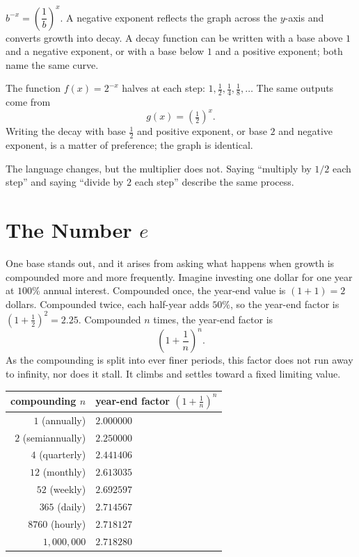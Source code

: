 \documentclass[12pt]{book}
\begin{document}
\begin{keyidea}
$b^{-x}=\left(\dfrac1b\right)^{x}$. A negative exponent reflects the graph across the
$y$-axis and converts growth into decay. A decay function can be written with a base
above $1$ and a negative exponent, or with a base below $1$ and a positive exponent;
both name the same curve.
\end{keyidea}

\begin{example}
The function $f(x)=2^{-x}$ halves at each step: $1,\tfrac12,\tfrac14,\tfrac18,\dots$
The same outputs come from
\[
g(x)=\left(\tfrac12\right)^{x}.
\]
Writing the decay with base $\tfrac12$ and positive exponent, or base $2$ and negative
exponent, is a matter of preference; the graph is identical.
\end{example}

The language changes, but the multiplier does not. Saying ``multiply by $1/2$ each
step'' and saying ``divide by $2$ each step'' describe the same process.

\section{The Number $e$}

One base stands out, and it arises from asking what happens when growth is compounded
more and more frequently. Imagine investing one dollar for one year at $100\%$ annual
interest. Compounded once, the year-end value is $(1+1)=2$ dollars. Compounded twice,
each half-year adds $50\%$, so the year-end factor is $(1+\tfrac12)^{2}=2.25$.
Compounded $n$ times, the year-end factor is
\[
\left(1+\frac1n\right)^{n}.
\]
As the compounding is split into ever finer periods, this factor does not run away to
infinity, nor does it stall. It climbs and settles toward a fixed limiting value.

\begin{center}
\renewcommand{\arraystretch}{1.25}
\begin{tabular}{@{}rl@{}}
\toprule
compounding $n$ & year-end factor $\left(1+\tfrac1n\right)^{n}$\\
\midrule
$1$ (annually)      & $2.000000$\\
$2$ (semiannually)  & $2.250000$\\
$4$ (quarterly)     & $2.441406$\\
$12$ (monthly)      & $2.613035$\\
$52$ (weekly)       & $2.692597$\\
$365$ (daily)       & $2.714567$\\
$8760$ (hourly)     & $2.718127$\\
$1{,}000{,}000$     & $2.718280$\\
\bottomrule
\end{tabular}
\end{center}
\end{document}
